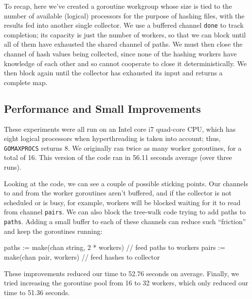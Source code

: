\documentclass[12pt,notitlepage]{article}
\begin{document}
To recap, here we've created a goroutine workgroup whose size is tied to the
number of available (logical) processors for the purpose of hashing files, with
the results fed into another single collector. We use a buffered channel \verb|done|
to track completion; its capacity is just the number of workers, so that we can
block until all of them have exhausted the shared channel of paths. We must then
close the channel of hash values being collected, since none of the hashing workers
have knowledge of each other and so cannot cooperate to close it deterministically.
We then block again until the collector has exhausted its input and returns a
complete map.

\subsection{Performance and Small Improvements}
These experiments were all run on an Intel core i7 quad-core CPU, which has eight
logical processors when hyperthreading is taken into account; thus, \verb|GOMAXPROCS|
returns 8. We originally ran twice as many worker goroutines, for a total of 16.
This version of the code ran in 56.11 seconds average (over three runs).

Looking at the code, we can see a couple of possible sticking points. Our channels
to and from the worker goroutines aren't buffered, and if the collector is not
scheduled or is busy, for example, workers will be blocked waiting for it to
read from channel \verb|pairs|. We can also block the tree-walk code trying to
add paths to \verb|paths|. Adding a small buffer to each of these channels can
reduce such ``friction'' and keep the goroutines running:
\begin{golang}
	paths := make(chan string, 2 * workers) // feed paths to workers
	pairs := make(chan pair, workers)       // feed hashes to collector
\end{golang}
These improvements reduced our time to 52.76 seconds on average. Finally, we tried
increasing the goroutine pool from 16 to 32 workers, which only reduced our time to
51.36 seconds.
\end{document}
